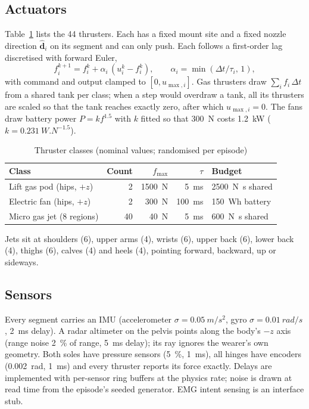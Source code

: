 \documentclass[conference]{IEEEtran}
\newcommand{\vect}[1]{\boldsymbol{#1}}
\begin{document}
\subsection{Actuators}
Table~\ref{tab:act} lists the 44 thrusters. Each has a fixed mount site and a fixed nozzle direction $\hat{\vect d}_i$ on its segment and can only push. Each follows a first-order lag discretised with forward Euler,
\begin{equation}
f_i^{k+1} = f_i^{k} + \alpha_i\,(u_i^{k}-f_i^{k}),\qquad \alpha_i=\min(\Delta t/\tau_i,\,1),
\label{eq:lag}
\end{equation}
with command and output clamped to $[0,u_{\max,i}]$. Gas thrusters draw $\sum_i f_i\,\Delta t$ from a shared tank per class; when a step would overdraw a tank, all its thrusters are scaled so that the tank reaches exactly zero, after which $u_{\max,i}=0$. The fans draw battery power $P=k f^{1.5}$ with $k$ fitted so that \SI{300}{N} costs \SI{1.2}{kW} ($k=\SI{0.231}{W.N^{-1.5}}$).

\begin{table}[t]
\centering
\caption{Thruster classes (nominal values; randomised per episode)}
\label{tab:act}
\setlength{\tabcolsep}{3.2pt}
\begin{tabular}{@{}lrrrl@{}}
\toprule
Class & Count & $f_{\max}$ & $\tau$ & Budget \\
\midrule
Lift gas pod (hips, $+z$) & 2 & \SI{1500}{N} & \SI{5}{ms} & \SI{2500}{N.s} shared \\
Electric fan (hips, $+z$) & 2 & \SI{300}{N} & \SI{100}{ms} & \SI{150}{Wh} battery \\
Micro gas jet (8 regions) & 40 & \SI{40}{N} & \SI{5}{ms} & \SI{600}{N.s} shared \\
\bottomrule
\end{tabular}
\vspace{2pt}

\footnotesize Jets sit at shoulders (6), upper arms (4), wrists (6), upper back (6), lower back (4), thighs (6), calves (4) and heels (4), pointing forward, backward, up or sideways.
\end{table}

\subsection{Sensors}
Every segment carries an IMU (accelerometer $\sigma=\SI{0.05}{m/s^2}$, gyro $\sigma=\SI{0.01}{rad/s}$, \SI{2}{ms} delay). A radar altimeter on the pelvis points along the body's $-z$ axis (range noise \SI{2}{\%} of range, \SI{5}{ms} delay); its ray ignores the wearer's own geometry. Both soles have pressure sensors (\SI{5}{\%}, \SI{1}{ms}), all hinges have encoders (\SI{0.002}{rad}, \SI{1}{ms}) and every thruster reports its force exactly. Delays are implemented with per-sensor ring buffers at the physics rate; noise is drawn at read time from the episode's seeded generator. EMG intent sensing is an interface stub.
\end{document}
